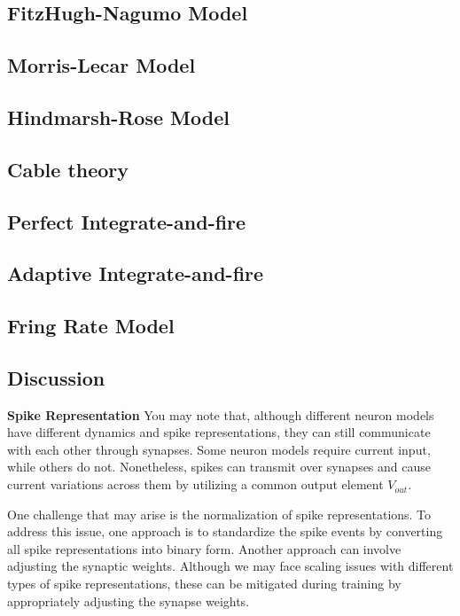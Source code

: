 
\subsection{FitzHugh-Nagumo Model}

\subsection{Morris-Lecar Model}

\subsection{Hindmarsh-Rose Model}

\subsection{Cable theory}

\subsection{Perfect Integrate-and-fire}

\subsection{Adaptive Integrate-and-fire}

\subsection{Fring Rate Model}

\subsection{Discussion}

\textbf{Spike Representation}
You may note that, although different neuron models have different dynamics and spike 
representations, they can still communicate with each other through synapses. Some neuron
 models require current input, while others do not. Nonetheless, spikes can transmit 
 over synapses and cause current variations across them by utilizing a common output element $V_{out}$. 
 
 One challenge that may arise is the normalization of spike representations.
To address this issue, one approach is to standardize the spike events by converting all
 spike representations into binary form. Another approach can involve adjusting the synaptic weights.
  Although we may face scaling issues with different types of spike representations, these
   can be mitigated during training by appropriately adjusting the synapse weights.


